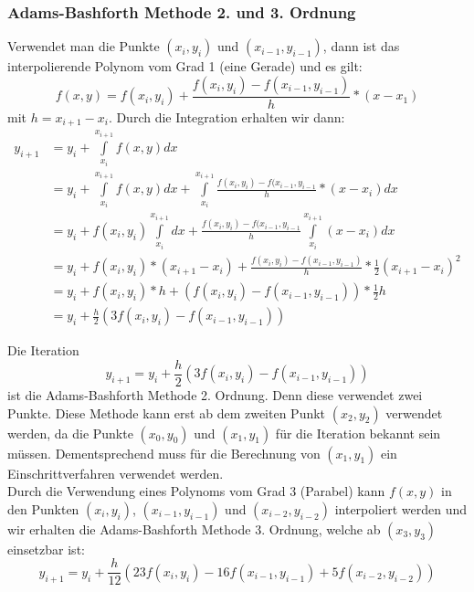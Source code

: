 \documentclass{article}
\theoremstyle{satz}
\theoremstyle{definition}
\begin{document}
\subsubsection{Adams-Bashforth Methode 2. und 3. Ordnung}
Verwendet man die Punkte $(x_i, y_i)$ und $(x_{i-1}, y_{i-1})$, dann ist das interpolierende Polynom vom Grad 1 (eine Gerade) und es gilt:
\begin{equation}
f(x,y) = f(x_i, y_i) + \frac{f(x_i, y_i) - f(x_{i-1}, y_{i-1})}{h}*(x-x_1)
\end{equation}
mit $h = x_{i+1} - x_i$. Durch die Integration erhalten wir dann:
\begin{equation}
\begin{split}
y_{i+1} &= y_i + \int\limits_{x_i}^{x_{i+1}} f(x,y)dx\\
&= y_i + \int\limits_{x_i}^{x_{i+1}} f(x,y)dx + \int\limits_{x_i}^{x_{i+1}} \frac{f(x_i, y_i) - f(x_{i-1}, y_{i-1}}{h}*(x-x_i)dx\\
&= y_i + f(x_i, y_i) \int\limits_{x_i}^{x_{i+1}} dx + \frac{f(x_i, y_i) - f(x_{i-1}, y_{i-1}}{h} \int\limits_{x_i}^{x_{i+1}}(x-x_i)dx\\
&= y_i + f(x_i, y_i) * (x_{i+1}-x_i) + \frac{f(x_i, y_i) - f(x_{i-1}, y_{i-1})}{h}*\frac{1}{2}(x_{i+1} - x_i)^2\\
&= y_i + f(x_i, y_i) * h + (f(x_i, y_i) - f(x_{i-1}, y_{i-1})) * \frac{1}{2}h\\
&= y_i + \frac{h}{2}(3f(x_i, y_i) - f(x_{i-1}, y_{i-1}))
\end{split}
\end{equation}

Die Iteration
\begin{equation}
y_{i+1} = y_i + \frac{h}{2}(3f(x_i, y_i) - f(x_{i-1}, y_{i-1}))
\end{equation}
ist die Adams-Bashforth Methode 2. Ordnung. Denn diese verwendet zwei Punkte. Diese Methode kann erst ab dem zweiten Punkt $(x_2, y_2)$ verwendet werden, da die Punkte $(x_0, y_0)$ und $(x_1, y_1)$ für die Iteration bekannt sein müssen. Dementsprechend muss für die Berechnung von $(x_1, y_1)$  ein Einschrittverfahren verwendet werden. \\
Durch die Verwendung eines Polynoms vom Grad 3 (Parabel) kann $f(x,y)$ in den Punkten $(x_i, y_i)$, $(x_{i-1}, y_{i-1})$ und $(x_{i-2}, y_{i-2})$ interpoliert werden und wir erhalten die Adams-Bashforth Methode 3. Ordnung, welche ab $(x_3, y_3)$ einsetzbar ist:
\begin{equation}
y_{i+1} = y_i + \frac{h}{12}(23f(x_i, y_i) - 16 f(x_{i-1}, y_{i-1}) + 5f(x_{i-2}, y_{i-2}))
\end{equation}
\end{document}
